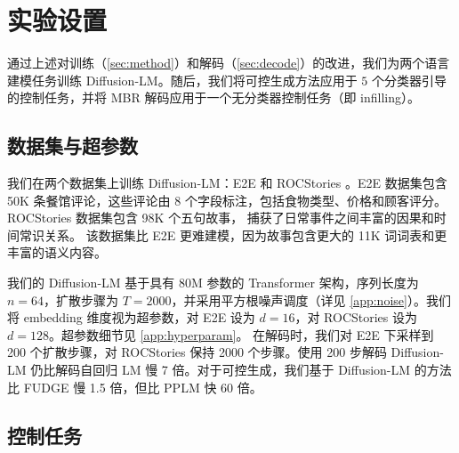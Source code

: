 \documentclass{article}
\begin{document}
\section{实验设置}
通过上述对训练（\cref{sec:method}）和解码（\cref{sec:decode}）的改进，我们为两个语言建模任务训练 Diffusion-LM。随后，我们将可控生成方法应用于 $5$ 个分类器引导的控制任务，并将 MBR 解码应用于一个无分类器控制任务（即 infilling）。

\label{sec:setup}
\subsection{数据集与超参数} 
我们在两个数据集上训练 Diffusion-LM：E2E \cite{novikova-etal-2017-e2e} 和 ROCStories \cite{mostafazadeh-etal-2016-corpus}。E2E 数据集包含 50K 条餐馆评论，这些评论由 8 个字段标注，包括食物类型、价格和顾客评分。
ROCStories 数据集包含 98K 个五句故事，
捕获了日常事件之间丰富的因果和时间常识关系。
该数据集比 E2E 更难建模，因为故事包含更大的 11K 词词表和更丰富的语义内容。


我们的 Diffusion-LM 基于具有 $80$M 参数的 Transformer \cite{Vaswani2017Attn} 架构，序列长度为 $n=64$，扩散步骤为 $T=2000$，并采用平方根噪声调度（详见 \cref{app:noise}）。我们将 embedding 维度视为超参数，对 E2E 设为 $d=16$，对 ROCStories 设为 $d=128$。超参数细节见 \cref{app:hyperparam}。
在解码时，我们对 E2E 下采样到 200 个扩散步骤，对 ROCStories 保持 2000 个步骤。使用 200 步解码 Diffusion-LM 仍比解码自回归 LM 慢 7 倍。对于可控生成，我们基于 Diffusion-LM 的方法比 FUDGE 慢 1.5 倍，但比 PPLM 快 60 倍。


\subsection{控制任务}
\label{ssec:control_gen_setup}
\end{document}
